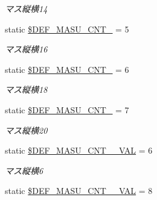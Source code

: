 \begin{DoxyCompactItemize}
\begin{DoxyCompactList}\small\item\em マス縦横14 \end{DoxyCompactList}\item 
static \hyperlink{class_reversi_const_a05fa5ab5e893a290425bdfa990db4105}{\$\+D\+E\+F\+\_\+\+M\+A\+S\+U\+\_\+\+C\+N\+T\+\_} = 5\hypertarget{class_reversi_const_a05fa5ab5e893a290425bdfa990db4105}{}\label{class_reversi_const_a05fa5ab5e893a290425bdfa990db4105}

\begin{DoxyCompactList}\small\item\em マス縦横16 \end{DoxyCompactList}\item 
static \hyperlink{class_reversi_const_ac4cdee79d87ba30c9e1ad5f76763a3c9}{\$\+D\+E\+F\+\_\+\+M\+A\+S\+U\+\_\+\+C\+N\+T\+\_} = 6\hypertarget{class_reversi_const_ac4cdee79d87ba30c9e1ad5f76763a3c9}{}\label{class_reversi_const_ac4cdee79d87ba30c9e1ad5f76763a3c9}

\begin{DoxyCompactList}\small\item\em マス縦横18 \end{DoxyCompactList}\item 
static \hyperlink{class_reversi_const_a45a5b589a2b3ac2af7d0e5d638791ffc}{\$\+D\+E\+F\+\_\+\+M\+A\+S\+U\+\_\+\+C\+N\+T\+\_} = 7\hypertarget{class_reversi_const_a45a5b589a2b3ac2af7d0e5d638791ffc}{}\label{class_reversi_const_a45a5b589a2b3ac2af7d0e5d638791ffc}

\begin{DoxyCompactList}\small\item\em マス縦横20 \end{DoxyCompactList}\item 
static \hyperlink{class_reversi_const_a610ea7766cdf77e22ee36f195efc73a1}{\$\+D\+E\+F\+\_\+\+M\+A\+S\+U\+\_\+\+C\+N\+T\+\_\+\_\+\+V\+AL} = 6\hypertarget{class_reversi_const_a610ea7766cdf77e22ee36f195efc73a1}{}\label{class_reversi_const_a610ea7766cdf77e22ee36f195efc73a1}

\begin{DoxyCompactList}\small\item\em マス縦横6 \end{DoxyCompactList}\item 
static \hyperlink{class_reversi_const_a0ae1ba6bd2dfeac3259b9b6afaaed4d2}{\$\+D\+E\+F\+\_\+\+M\+A\+S\+U\+\_\+\+C\+N\+T\+\_\+\_\+\+V\+AL} = 8\hypertarget{class_reversi_const_a0ae1ba6bd2dfeac3259b9b6afaaed4d2}{}\label{class_reversi_const_a0ae1ba6bd2dfeac3259b9b6afaaed4d2}


\end{DoxyCompactItemize}

